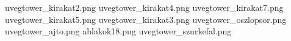 uvegtower_kirakat2.png
uvegtower_kirakat4.png
uvegtower_kirakat7.png
uvegtower_kirakat5.png
uvegtower_kirakat3.png
uvegtower_oszlopsor.png
uvegtower_ajto.png
ablakok18.png
uvegtower_szurkefal.png
